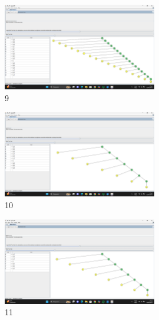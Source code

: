 \documentclass[a4paper,12pt]{article}
\begin{document}
    \begin{figure}[H]
        \centering
        \includegraphics[width=0.6\textwidth]{Aula03/Daniel/9.png}
        \caption*{9}
    \end{figure}
    \begin{figure}[H]
        \centering
        \includegraphics[width=0.6\textwidth]{Aula03/Daniel/10.png}
        \caption*{10}
    \end{figure}
    \begin{figure}[H]
        \centering
        \includegraphics[width=0.6\textwidth]{Aula03/Daniel/11.png}
        \caption*{11}
    \end{figure}
\end{document}
